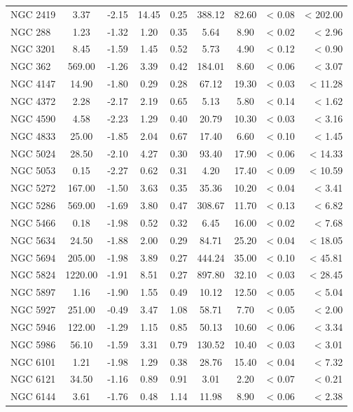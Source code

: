 \documentclass[doublespace,nopageskip]{VTthesis} %
\begin{document}
\begin{appendices}
\begin{center}
\begin{longtable}{lcccccccr}
NGC 2419 & 3.37 & -2.15 & 14.45 & 0.25 & 388.12 & 82.60 & < 0.08 & < 202.00\\
NGC 288 & 1.23 & -1.32 & 1.20 & 0.35 & 5.64 & 8.90 & < 0.02 & < 2.96\\
NGC 3201 & 8.45 & -1.59 & 1.45 & 0.52 & 5.73 & 4.90 & < 0.12 & < 0.90\\
NGC 362 & 569.00 & -1.26 & 3.39 & 0.42 & 184.01 & 8.60 & < 0.06 & < 3.07\\
NGC 4147 & 14.90 & -1.80 & 0.29 & 0.28 & 67.12 & 19.30 & < 0.03 & < 11.28\\
NGC 4372 & 2.28 & -2.17 & 2.19 & 0.65 & 5.13 & 5.80 & < 0.14 & < 1.62\\
NGC 4590 & 4.58 & -2.23 & 1.29 & 0.40 & 20.79 & 10.30 & < 0.03 & < 3.16\\
NGC 4833 & 25.00 & -1.85 & 2.04 & 0.67 & 17.40 & 6.60 & < 0.10 & < 1.45\\
NGC 5024 & 28.50 & -2.10 & 4.27 & 0.30 & 93.40 & 17.90 & < 0.06 & < 14.33\\
NGC 5053 & 0.15 & -2.27 & 0.62 & 0.31 & 4.20 & 17.40 & < 0.09 & < 10.59\\
NGC 5272 & 167.00 & -1.50 & 3.63 & 0.35 & 35.36 & 10.20 & < 0.04 & < 3.41\\
NGC 5286 & 569.00 & -1.69 & 3.80 & 0.47 & 308.67 & 11.70 & < 0.13 & < 6.82\\
NGC 5466 & 0.18 & -1.98 & 0.52 & 0.32 & 6.45 & 16.00 & < 0.02 & < 7.68\\
NGC 5634 & 24.50 & -1.88 & 2.00 & 0.29 & 84.71 & 25.20 & < 0.04 & < 18.05\\
NGC 5694 & 205.00 & -1.98 & 3.89 & 0.27 & 444.24 & 35.00 & < 0.10 & < 45.81\\
NGC 5824 & 1220.00 & -1.91 & 8.51 & 0.27 & 897.80 & 32.10 & < 0.03 & < 28.45\\
NGC 5897 & 1.16 & -1.90 & 1.55 & 0.49 & 10.12 & 12.50 & < 0.05 & < 5.04\\
NGC 5927 & 251.00 & -0.49 & 3.47 & 1.08 & 58.71 & 7.70 & < 0.05 & < 2.00\\
NGC 5946 & 122.00 & -1.29 & 1.15 & 0.85 & 50.13 & 10.60 & < 0.06 & < 3.34\\
NGC 5986 & 56.10 & -1.59 & 3.31 & 0.79 & 130.52 & 10.40 & < 0.03 & < 3.01\\
NGC 6101 & 1.21 & -1.98 & 1.29 & 0.38 & 28.76 & 15.40 & < 0.04 & < 7.32\\
NGC 6121 & 34.50 & -1.16 & 0.89 & 0.91 & 3.01 & 2.20 & < 0.07 & < 0.21\\
NGC 6144 & 3.61 & -1.76 & 0.48 & 1.14 & 11.98 & 8.90 & < 0.06 & < 2.38\\

\end{longtable}
\end{center}
\end{appendices}
\end{document}
